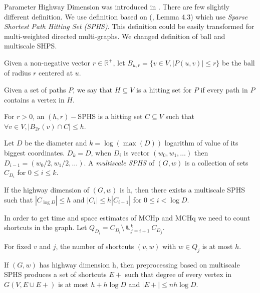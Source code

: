 
Parameter Highway Dimension was introduced in \cite{abraham2010highway}.
There are few slightly different definition. 
We use definition based on (\cite{abraham2016highway}, Lemma 4.3)
which  use \emph{ Sparse Shortest Path Hitting Set (SPHS)}.
This definition could be easily transformed for multi-weighted directed
multi-graphs. We changed definition of ball and multiscale SHPS.


\begin{definition}
Given a non-negative vector $r \in \mathbb{R}^+$, let 
$B_{u,r} = \{v \in V, |P(u, v)| \le r \}$ 
be the ball of radius $r$ centered at $u$.
\end{definition}

\begin{definition}
Given a set of paths $P$, we say that $H \subseteq V$ is a hitting set for $P$ if every
path in $P$ contains a vertex in $H$. 
\end{definition}

\begin{definition}
For $r > 0$, an $(h, r)-$SPHS is a hitting set $C \subseteq V$ such that
$\forall v \in V, |B_{2r} (v) \cap C| \le h$.
\end{definition}

\begin{definition}
Let $D$ be the diameter and $k = \log(\max(D))$ logarithm of value of its biggest coordinates. 
$D_k = D$, when $D_i$ is vector $(w_0,w_1,\dots)$ then $D_{i-1} = (w_0/2,w_1/2,\dots)$. 
A \emph{multiscale SPHS} of $(G,w)$ is a collection of sets $C_{D_i}$ for $0 \le i \le k$.
\end{definition}

\begin{definition}
If the highway dimension of $(G,w)$ is h, then there exists a multiscale
SPHS such that $|C_{\log D}| \le h$ and $|C_i| \le h|C_{i+1}|$ for $0 \le i < \log D$.
\end{definition}

In order to get time and space estimates of MCHp and MCHq we need to count shortcuts in
the graph. Let $Q_{D_i} = C_{D_i} \setminus \Cup^{k}_{j=i+1}C_{D_j}$.

\begin{lemma}
For fixed $v$ and $j$, the number of shortcuts $(v,w)$ with $w\in Q_j$ is at most $h$.
\end{lemma}

\begin{theorem}
\label{shrotcutsNumber}
If $(G,w)$ has highway dimension h, then preprocessing based on
multiscale SPHS produces a set of shortcuts $E+$ such that degree of every vertex in
$G(V, E \cup E+)$ is at most $h + h \log D$ and $|E+| \le nh\log D$.
\end{theorem}

